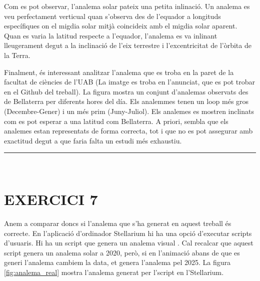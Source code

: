 \documentclass[a4paper, 11pt]{article}
\begin{document}
\noindent Com es pot observar, l'analema solar pateix una petita inlinació. Un analema es veu perfectament verticual quan s'observa des de l'equador a longituds específiques on el migdia solar mitjà coincideix amb el migdia solar aparent. Quan es varia la latitud respecte a l'equador, l'analema es va inlinant lleugerament degut a la inclinació de l'eix terrestre i l'excentricitat de l'òrbita de la Terra.

\vspace{2mm}

\noindent Finalment, és interessant analitzar l'analema que es troba en la paret de la facultat de ciències de l'UAB (La imatge es troba en l'anunciat, que es pot trobar en el Github del treball). La figura mostra un conjunt d'analemas observats des de Bellaterra per diferents hores del día. Els analemmes tenen un loop més gros (Decembre-Gener) i un més prim (Juny-Juliol). Els analemes es mostren inclinats com es pot esperar a una latitud com Bellaterra. A priori, sembla que els analemes estan representats de forma correcta, tot i que no es pot assegurar amb exactitud degut a que faria falta un estudi més exhaustiu.

\vspace{10mm}
\hrule\
\vspace{5mm}


\section*{EXERCICI 7}

\noindent Anem a comparar doncs si l'analema que s'ha generat en aquest treball és correcte. En l'aplicació d'ordinador Stellarium hi ha una opció d'executar scripts d'usuaris. Hi ha un script que genera un analema visual \cite{SCRIPT_STELLARIUM}. Cal recalcar que aquest script genera un analema solar a 2020, però, si en l'animació abans de que es generi l'analema cambiem la data, et genera l'analema pel 2025. La figura \ref{fig:analema_real} mostra l'analema generat per l'script en l'Stellarium.
\end{document}
